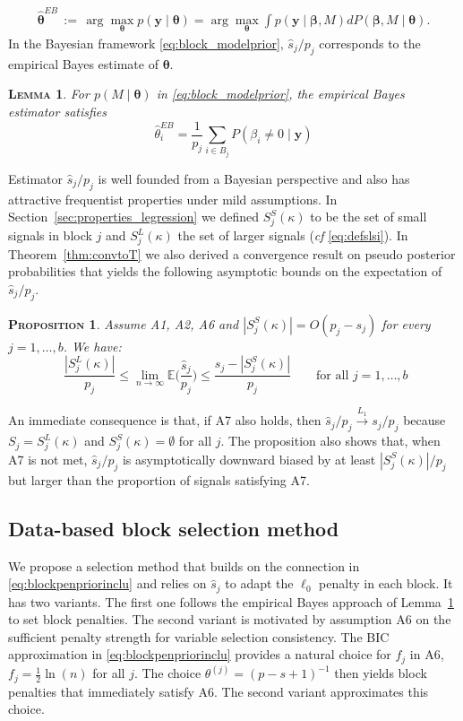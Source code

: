 \documentclass[aos]{imsart}
\theoremstyle{plain}
\newtheorem{prop}[thm]{\textsc{Proposition}}
\newtheorem{lem}[thm]{\textsc{Lemma}}
\newcommand{\E}{\mathbb{E}}
\newcommand{\bs}{\boldsymbol}
\begin{document}
\begin{eqnarray}
\hat{\bs \theta}^{EB}\,:=\, \arg\max_{\bs \theta} p(\bs y \mid \bs \theta)=
\arg\max_{\bs \theta} \int p(\bs y \mid \bs \beta, M) d P(\bs \beta, M \mid \bs \theta).
\nonumber
\end{eqnarray}
 In the Bayesian framework \eqref{eq:block_modelprior}, $\widehat{s}_j/p_j$ corresponds to the empirical Bayes estimate of $\bs \theta$.
\begin{lem}\label{lem:empiricalbayesinterpret} For $p(M \mid \bs \theta)$ in \eqref{eq:block_modelprior}, the empirical Bayes estimator satisfies $$\hat{\theta}^{EB}_i = \frac{1}{p_j}\sum_{i\in B_j}P(\beta_i \neq 0 \mid \bs y)$$
\end{lem}
Estimator $\widehat{s}_j/p_j$ is well founded from a Bayesian perspective and also has attractive frequentist properties under mild assumptions. In Section~\ref{sec:properties_legression} we defined $S^{S}_j(\kappa)$ to be the set of small signals in block $j$ and  $S^{L}_j(\kappa)$ the set of larger signals (\textit{cf} \eqref{eq:defslsi}). In Theorem~\ref{thm:convtoT} we also derived a convergence result on pseudo posterior probabilities that yields the following asymptotic bounds on the expectation of $\widehat{s}_j/p_j$.
\begin{prop}
    \label{prop:shatconsistence}
Assume A1, A2, A6 and $|S^{S}_j(\kappa)|=O(p_j-s_j)$ for every $j=1,\ldots,b$. We have:$$ \,\, \frac{|S^{L}_j(\kappa)|}{p_j}\leq \lim_{n\to\infty}\E\bigg(\frac{\widehat{s}_j}{p_j}\bigg)\leq \frac{s_j-|S^{S}_j(\kappa)|}{p_j}\qquad\text{for all }j=1,\ldots,b$$
\end{prop}
An immediate consequence is that, if A7 also holds, then $\widehat{s}_j/p_j \stackrel{L_1}{\longrightarrow} s_j/p_j$
because $S_j=S_j^{L}(\kappa)$ and $S_j^{S}(\kappa)=\emptyset$ for all $j$. The proposition also shows that, when A7 is not met, $\widehat{s}_j/p_j$ is asymptotically downward biased by at least $|S^{S}_j(\kappa)|/p_j$ but larger than the proportion of signals satisfying A7. 

\subsection{Data-based block selection method}

We propose a selection method that builds on the connection in \eqref{eq:blockpenpriorinclu} and relies on $\widehat{s}_j$ to adapt the $\ell_0$ penalty in each block. It has two variants. The first one follows the empirical Bayes approach of Lemma~\ref{lem:empiricalbayesinterpret} to set block penalties. The second variant is motivated by assumption A6 on the sufficient penalty strength for variable selection consistency. The BIC approximation in \eqref{eq:blockpenpriorinclu} provides a natural choice for $f_j$ in A6, $f_j=\frac{1}{2}\ln(n)$ for all $j$. The choice $\theta^{(j)}=(p-s+1)^{-1}$ then yields block penalties that immediately satisfy A6. The second variant approximates this choice.\\
\end{document}
